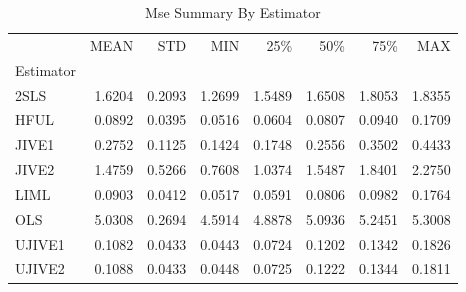 \begin{table}[ht]
\centering
\caption{Mse Summary By Estimator}
\begin{tabular}{lrrrrrrr}
\toprule
 & MEAN & STD & MIN & 25\% & 50\% & 75\% & MAX \\
Estimator &  &  &  &  &  &  &  \\
\midrule
2SLS & 1.6204 & 0.2093 & 1.2699 & 1.5489 & 1.6508 & 1.8053 & 1.8355 \\
HFUL & 0.0892 & 0.0395 & 0.0516 & 0.0604 & 0.0807 & 0.0940 & 0.1709 \\
JIVE1 & 0.2752 & 0.1125 & 0.1424 & 0.1748 & 0.2556 & 0.3502 & 0.4433 \\
JIVE2 & 1.4759 & 0.5266 & 0.7608 & 1.0374 & 1.5487 & 1.8401 & 2.2750 \\
LIML & 0.0903 & 0.0412 & 0.0517 & 0.0591 & 0.0806 & 0.0982 & 0.1764 \\
OLS & 5.0308 & 0.2694 & 4.5914 & 4.8878 & 5.0936 & 5.2451 & 5.3008 \\
UJIVE1 & 0.1082 & 0.0433 & 0.0443 & 0.0724 & 0.1202 & 0.1342 & 0.1826 \\
UJIVE2 & 0.1088 & 0.0433 & 0.0448 & 0.0725 & 0.1222 & 0.1344 & 0.1811 \\
\bottomrule
\end{tabular}
\end{table}
